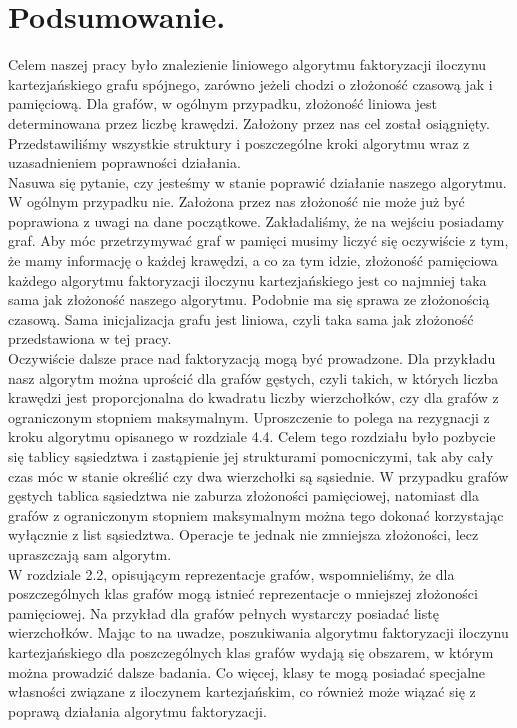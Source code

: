 \documentclass[12pt,a4paper,titlepage]{article}
\newcommand\tab[1][1cm]{\hspace*{#1}}
\begin{document}
\section*{Podsumowanie.}
Celem naszej pracy było znalezienie liniowego algorytmu faktoryzacji iloczynu kartezjańskiego grafu spójnego, zarówno jeżeli chodzi o złożoność czasową jak i pamięciową. Dla grafów, w ogólnym przypadku, złożoność liniowa jest determinowana przez liczbę krawędzi. Założony przez nas cel został osiągnięty. Przedstawiliśmy wszystkie struktury i poszczególne kroki algorytmu wraz z uzasadnieniem poprawności działania.\\
\tab[0.6cm]Nasuwa się pytanie, czy jesteśmy w stanie poprawić działanie naszego algorytmu. W ogólnym przypadku nie. Założona przez nas złożoność nie może już być poprawiona z uwagi na dane początkowe. Zakładaliśmy, że na wejściu posiadamy graf. Aby móc przetrzymywać graf w pamięci musimy liczyć się oczywiście z tym, że mamy informację o każdej krawędzi, a co za tym idzie, złożoność pamięciowa każdego algorytmu faktoryzacji iloczynu kartezjańskiego jest co najmniej taka sama jak złożoność naszego algorytmu. Podobnie ma się sprawa ze złożonością czasową. Sama inicjalizacja grafu jest liniowa, czyli taka sama jak złożoność przedstawiona w tej pracy.\\
\tab[0.6cm]Oczywiście dalsze prace nad faktoryzacją mogą być prowadzone. Dla przykładu nasz algorytm można uprościć dla grafów gęstych, czyli takich, w których liczba krawędzi jest proporcjonalna do kwadratu liczby wierzchołków, czy dla grafów z ograniczonym stopniem maksymalnym. Uproszczenie to polega na rezygnacji z kroku algorytmu opisanego w rozdziale 4.4. Celem tego rozdziału było pozbycie się tablicy sąsiedztwa i zastąpienie jej strukturami pomocniczymi, tak aby cały czas móc w stanie określić czy dwa wierzchołki są sąsiednie. W przypadku grafów gęstych tablica sąsiedztwa nie zaburza złożoności pamięciowej, natomiast dla grafów z ograniczonym stopniem maksymalnym można tego dokonać korzystając wyłącznie z list sąsiedztwa. Operacje te jednak nie zmniejsza złożoności, lecz upraszczają sam algorytm.\\
\tab[0.6cm]W rozdziale 2.2, opisującym reprezentacje grafów, wspomnieliśmy, że dla poszczególnych klas grafów mogą istnieć reprezentacje o mniejszej złożoności pamięciowej. Na przykład dla grafów pełnych wystarczy posiadać listę wierzchołków. Mając to na uwadze, poszukiwania algorytmu faktoryzacji iloczynu kartezjańskiego dla poszczególnych klas grafów wydają się obszarem, w którym można prowadzić dalsze badania. Co więcej, klasy te mogą posiadać specjalne własności związane z iloczynem kartezjańskim, co również może wiązać się z poprawą działania algorytmu faktoryzacji.
\end{document}

